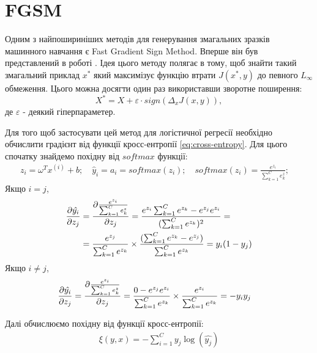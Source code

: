 \documentclass[a4paper,14pt]{extreport}
\newcommand{\tran}{^{T}}
\newcommand{\ith}{^{(i)}}
\begin{document}
	\section{FGSM}
	Одним з найпошириніших методів для генерування змагальних зразків машинного навчання є Fast Gradient Sign Method. Вперше він був представлений в роботі \textcite{goodfellow2014explaining}. Ідея цього методу полягає в тому, щоб знайти такий змагальний приклад $x^{*}$ який максимізує функцію втрати $J(x^{*}, y)$ до певного $L_{\infty}$ обмеження. Цього можна досягти один раз використавши зворотне поширення:
	\begin{equation}
	X^{*} = X + \varepsilon \cdot sign(\Delta_x J(x, y)),
	\end{equation}
	де $\varepsilon$ - деякий гіперпараметер.
	
	Для того щоб застосувати цей метод для логістичної регресії необхідно обчислити градієнт від функції кросс-ентропії \ref{eq:cross-entropy}. Для цього спочатку знайдемо похідну від $softmax$ функції:
	\begin{align*}
		z_i = \omega\tran x\ith + b; \quad
		\hat{y}_i = a_i = softmax(z_i); \quad
		softmax(z_i) = \frac{e^{z_i}}{\sum_{k=1}^{C} e_k^z}; \quad
	\end{align*}
	Якщо $i = j$,
	\begin{align}
	    \pdv{\hat{y_i}}{z_j} 
	    &=
	    \pdv{\frac{e^{z_i}}{\sum_{k=1}^{C} e_k^z}}{z_j} 
	    =
	    \frac{e^{z_i} \sum_{k=1}^{C} e^{z_k} - e^{z_j} e^{z_i}}{(\sum_{k=1}^{C}  e^{z_k})^2} 
	    = \\& =
	    \frac{e^{z_j}}{\sum_{k=1}^{C}  e^{z_k}} \times \frac{(\sum_{k=1}^{C} e^{z_k} - e^{z_j})}{\sum_{k=1}^{C}  e^{z_k}} 
	    = 
	    y_i(1-y_j)
	\end{align}
	Якщо $i \neq j$,
	\begin{align}
		\pdv{\hat{y_i}}{z_j}
		&=
		\pdv{\frac{e^{z_i}}{\sum_{k=1}^{C} e_k^z}}{z_j} 
		=
		\frac{0 - e^{z_j} e^{z_i}}{\sum_{k=1}^{C}  e^{z_k}} \times \frac{e^{z_i}}{\sum_{k=1}^{C} e^{z_k}} 
		= 
		-y_i y_j 
	\end{align}
	
	\begingroup
	\setlength{\abovedisplayskip}{0pt}
	\setlength{\belowdisplayskip}{0pt}
	
	Далі обчислюємо похідну від функції кросс-ентропії:
	\begin{align*}
		\xi(y, x) = - \sum_{i=1}^{C} y_j  \log (\hat{y_j})
	\end{align*}
\end{document}
